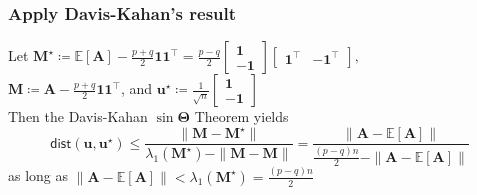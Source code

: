 \documentclass[compress,
mathserif,wide,%
]{beamer}
\begin{document}
\begin{frame}
\frametitle{Apply Davis-Kahan's result}
Let \quad $
\bm{M}^{\star}\coloneqq\mathbb{E}[\bm{A}]-\frac{p+q}{2}\bm{1}\bm{1}^{\top}=\frac{p-q}{2}\left[\begin{array}{c}
\bm{1}\\
-\bm{1}
\end{array}\right]\left[\begin{array}{cc}
\bm{1}^{\top} & -\bm{1}^{\top}\end{array}\right], 
$ \\
\qquad$
\bm{M}\coloneqq \bm{A}-\frac{p+q}{2}\bm{1}\bm{1}^{\top}
$, and 
$
\bm{u}^{\star}\coloneqq \frac{1}{\sqrt{n}}\left[\begin{array}{c}
\bm{1}\\
-\bm{1}
\end{array}\right]
$ \\

\vfill
Then the Davis-Kahan $\sin\bm{\Theta}$ Theorem yields
%
\begin{equation}
	\label{eq:DK-SBM}
	\mathsf{dist}( {\bm{u}}, \bm{u}^{\star}) \leq\frac{\|{\bm{M}} - \bm{M}^{\star}\|}{\lambda_{1}(\bm{M}^{\star})-\|{\bm{M}} - \bm{M}\|}=\frac{\|\bm{A}-\mathbb{E}[\bm{A}]\|}{\frac{(p-q)n}{2}-\|\bm{A}-\mathbb{E}[\bm{A}]\|}
\end{equation}
as long as $\|\bm{A}-\mathbb{E}[\bm{A}]\| < \lambda_{1}(\bm{M}^{\star})=\frac{(p-q)n}{2}$
%
%
%

	
\end{frame}
\end{document}
